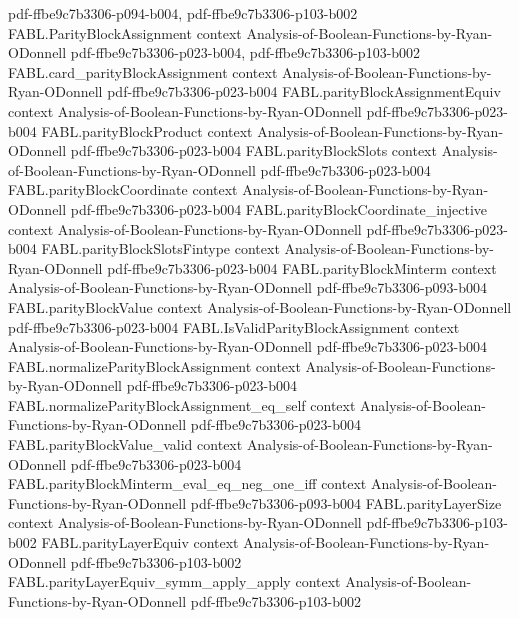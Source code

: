\begin{theorem}
  {pdf-ffbe9c7b3306-p094-b004,
    pdf-ffbe9c7b3306-p103-b002}
\proofstep
  {FABL.ParityBlockAssignment}
  {context}
  {Analysis-of-Boolean-Functions-by-Ryan-ODonnell}
  {pdf-ffbe9c7b3306-p023-b004,
    pdf-ffbe9c7b3306-p103-b002}
\proofstep
  {FABL.card_parityBlockAssignment}
  {context}
  {Analysis-of-Boolean-Functions-by-Ryan-ODonnell}
  {pdf-ffbe9c7b3306-p023-b004}
\proofstep
  {FABL.parityBlockAssignmentEquiv}
  {context}
  {Analysis-of-Boolean-Functions-by-Ryan-ODonnell}
  {pdf-ffbe9c7b3306-p023-b004}
\proofstep
  {FABL.parityBlockProduct}
  {context}
  {Analysis-of-Boolean-Functions-by-Ryan-ODonnell}
  {pdf-ffbe9c7b3306-p023-b004}
\proofstep
  {FABL.parityBlockSlots}
  {context}
  {Analysis-of-Boolean-Functions-by-Ryan-ODonnell}
  {pdf-ffbe9c7b3306-p023-b004}
\proofstep
  {FABL.parityBlockCoordinate}
  {context}
  {Analysis-of-Boolean-Functions-by-Ryan-ODonnell}
  {pdf-ffbe9c7b3306-p023-b004}
\proofstep
  {FABL.parityBlockCoordinate_injective}
  {context}
  {Analysis-of-Boolean-Functions-by-Ryan-ODonnell}
  {pdf-ffbe9c7b3306-p023-b004}
\proofstep
  {FABL.parityBlockSlotsFintype}
  {context}
  {Analysis-of-Boolean-Functions-by-Ryan-ODonnell}
  {pdf-ffbe9c7b3306-p023-b004}
\proofstep
  {FABL.parityBlockMinterm}
  {context}
  {Analysis-of-Boolean-Functions-by-Ryan-ODonnell}
  {pdf-ffbe9c7b3306-p093-b004}
\proofstep
  {FABL.parityBlockValue}
  {context}
  {Analysis-of-Boolean-Functions-by-Ryan-ODonnell}
  {pdf-ffbe9c7b3306-p023-b004}
\proofstep
  {FABL.IsValidParityBlockAssignment}
  {context}
  {Analysis-of-Boolean-Functions-by-Ryan-ODonnell}
  {pdf-ffbe9c7b3306-p023-b004}
\proofstep
  {FABL.normalizeParityBlockAssignment}
  {context}
  {Analysis-of-Boolean-Functions-by-Ryan-ODonnell}
  {pdf-ffbe9c7b3306-p023-b004}
\proofstep
  {FABL.normalizeParityBlockAssignment_eq_self}
  {context}
  {Analysis-of-Boolean-Functions-by-Ryan-ODonnell}
  {pdf-ffbe9c7b3306-p023-b004}
\proofstep
  {FABL.parityBlockValue_valid}
  {context}
  {Analysis-of-Boolean-Functions-by-Ryan-ODonnell}
  {pdf-ffbe9c7b3306-p023-b004}
\proofstep
  {FABL.parityBlockMinterm_eval_eq_neg_one_iff}
  {context}
  {Analysis-of-Boolean-Functions-by-Ryan-ODonnell}
  {pdf-ffbe9c7b3306-p093-b004}
\proofstep
  {FABL.parityLayerSize}
  {context}
  {Analysis-of-Boolean-Functions-by-Ryan-ODonnell}
  {pdf-ffbe9c7b3306-p103-b002}
\proofstep
  {FABL.parityLayerEquiv}
  {context}
  {Analysis-of-Boolean-Functions-by-Ryan-ODonnell}
  {pdf-ffbe9c7b3306-p103-b002}
\proofstep
  {FABL.parityLayerEquiv_symm_apply_apply}
  {context}
  {Analysis-of-Boolean-Functions-by-Ryan-ODonnell}
  {pdf-ffbe9c7b3306-p103-b002}

\end{theorem}
